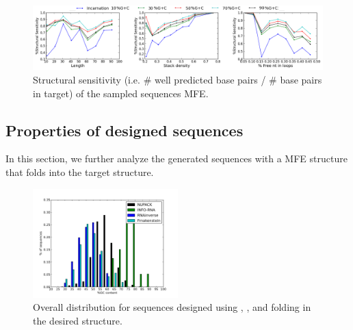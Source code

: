 \begin{figure}[ht!]
 	\centering
	\includegraphics[width=\textwidth]{Figures/rnastrand_clustered_rnainverse_100samples_struct_sens.png}
	\caption{Structural sensitivity (i.e. $\#$ well predicted base pairs / $\#$ base pairs in target) of the sampled sequences MFE. }
	\label{fig:ss_sens}	
\end{figure}

\subsection{Properties of designed sequences}

In this section, we further analyze the generated sequences with a MFE structure that folds into the target structure. 


\begin{figure}[ht!]
  \begin{center}
    \includegraphics[width=0.5\textwidth]{Figures/histograme_5_gc_distribution_nornaexinv.png}
  \end{center}
  \caption{Overall \GCContent distribution for sequences designed using \RNAinverse, \INFORNA, \NUPACK and \frankenstein folding in the desired structure.}
  \label{fig:gcdist}
\end{figure}

